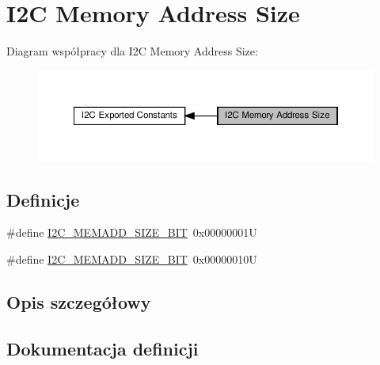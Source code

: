 \hypertarget{group___i2_c___memory___address___size}{}\section{I2C Memory Address Size}
\label{group___i2_c___memory___address___size}
Diagram współpracy dla I2C Memory Address Size\+:\nopagebreak
\begin{figure}[H]
\begin{center}
\leavevmode
\includegraphics[width=350pt]{group___i2_c___memory___address___size}
\end{center}
\end{figure}
\subsection*{Definicje}
\begin{DoxyCompactItemize}
\item 
\#define \hyperlink{group___i2_c___memory___address___size_ga44007b689fa80deeab22820ad0b2dc6d}{I2\+C\+\_\+\+M\+E\+M\+A\+D\+D\+\_\+\+S\+I\+Z\+E\+\_\+B\+IT}~0x00000001U
\item 
\#define \hyperlink{group___i2_c___memory___address___size_ga5b8c4b7d245fd7ab998acf2c7edd61a4}{I2\+C\+\_\+\+M\+E\+M\+A\+D\+D\+\_\+\+S\+I\+Z\+E\+\_\+B\+IT}~0x00000010U
\end{DoxyCompactItemize}


\subsection{Opis szczegółowy}


\subsection{Dokumentacja definicji}
\mbox{\label{group___i2_c___memory___address___size_ga5b8c4b7d245fd7ab998acf2c7edd61a4}} 
